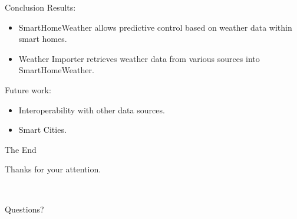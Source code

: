 \documentclass{beamer}
\begin{document}
\begin{frame}{Conclusion}
	Results:
	\begin{itemize}
		\item SmartHomeWeather allows predictive control based on weather data within smart homes.
		\item Weather Importer retrieves weather data from various sources into SmartHomeWeather.
	\end{itemize}

	Future work:
	\begin{itemize}
		\item Interoperability with other data sources.
		\item Smart Cities.
	\end{itemize}
\end{frame}

\begin{frame}{The End}
	\begin{center}
		Thanks for your attention.

		~

		Questions?
	\end{center}
\end{frame}
\end{document}
